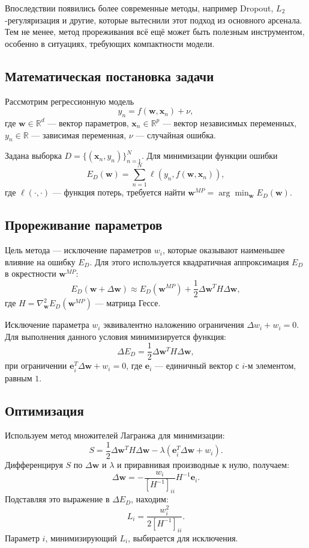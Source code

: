 Впоследствии появились более современные методы, например Dropout, $L_2$-регуляризация и другие, которые вытеснили этот подход из основного арсенала.
Тем не менее, метод прореживания всё ещё может быть полезным инструментом, особенно в ситуациях, требующих компактности модели.

\subsection*{Математическая постановка задачи}
Рассмотрим регрессионную модель
\[
	y_n = f(\mathbf{w}, \mathbf{x}_n) + \nu,
\]
где $\mathbf{w} \in \mathbb{R}^d$ — вектор параметров, $\mathbf{x}_n \in \mathbb{R}^p$ — вектор независимых переменных, $y_n \in \mathbb{R}$ — зависимая переменная, $\nu$ — случайная ошибка.

Задана выборка $D = \{(\mathbf{x}_n, y_n)\}_{n=1}^N$. Для минимизации функции ошибки
\[
	E_D(\mathbf{w}) = \sum_{n=1}^N \ell(y_n, f(\mathbf{w}, \mathbf{x}_n)),
\]
где $\ell(\cdot, \cdot)$ — функция потерь, требуется найти $\mathbf{w}^{MP} = \arg\min_{\mathbf{w}} E_D(\mathbf{w})$.

\subsection*{Прореживание параметров}
Цель метода — исключение параметров $w_i$, которые оказывают наименьшее влияние на ошибку $E_D$.
Для этого используется квадратичная аппроксимация $E_D$ в окрестности $\mathbf{w}^{MP}$:
\[
	E_D(\mathbf{w} + \Delta\mathbf{w}) \approx E_D(\mathbf{w}^{MP}) + \frac{1}{2} \Delta\mathbf{w}^T H \Delta\mathbf{w},
\]
где $H = \nabla^2_{\mathbf{w}} E_D(\mathbf{w}^{MP})$ — матрица Гессе.

Исключение параметра $w_i$ эквивалентно наложению ограничения $\Delta w_i + w_i = 0$.
Для выполнения данного условия минимизируется функция:
\[
	\Delta E_D = \frac{1}{2} \Delta\mathbf{w}^T H \Delta\mathbf{w},
\]
при ограничении $\mathbf{e}_i^T \Delta\mathbf{w} + w_i = 0$, где $\mathbf{e}_i$ — единичный вектор с $i$-м элементом, равным $1$.

\subsection*{Оптимизация}
Используем метод множителей Лагранжа для минимизации:
\[
	S = \frac{1}{2} \Delta\mathbf{w}^T H \Delta\mathbf{w} - \lambda (\mathbf{e}_i^T \Delta\mathbf{w} + w_i).
\]
Дифференцируя $S$ по $\Delta\mathbf{w}$ и $\lambda$ и приравнивая производные к нулю, получаем:
\[
	\Delta\mathbf{w} = -\frac{w_i}{[H^{-1}]_{ii}} H^{-1} \mathbf{e}_i.
\]
Подставляя это выражение в $\Delta E_D$, находим:
\[
	L_i = \frac{w_i^2}{2 [H^{-1}]_{ii}}.
\]
Параметр $i$, минимизирующий $L_i$, выбирается для исключения.

